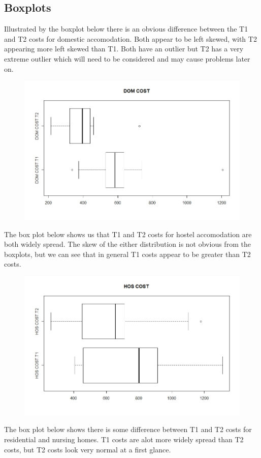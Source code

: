 \documentclass[]{article}
\begin{document}
\subsection{Boxplots}
Illustrated by the boxplot below there is an obvious difference between the T1 and T2 costs for domestic accomodation. Both appear to be left skewed, with T2 appearing more left skewed than T1. Both have an outlier but T2 has a very extreme outlier which will need to be considered and may cause problems later on.
\begin{figure}[H]
\centering
\includegraphics[width=12cm]{RStudio/jpeg/Box_DOM.jpeg}
\end{figure}
The box plot below shows us that T1 and T2 costs for hostel accomodation are both widely spread. The skew of the either distribution is not obvious from the boxplots, but we can see that in general T1 costs appear to be greater than T2 costs.
\begin{figure}[H]
\centering
\includegraphics[width=12cm]{RStudio/jpeg/Box_HOS.jpeg}
\end{figure}
\newpage
The box plot below shows there is some difference between T1 and T2 costs for residential and nursing homes. T1 costs are alot more widely spread than T2 costs, but T2 costs look very normal at a first glance.
\end{document}
